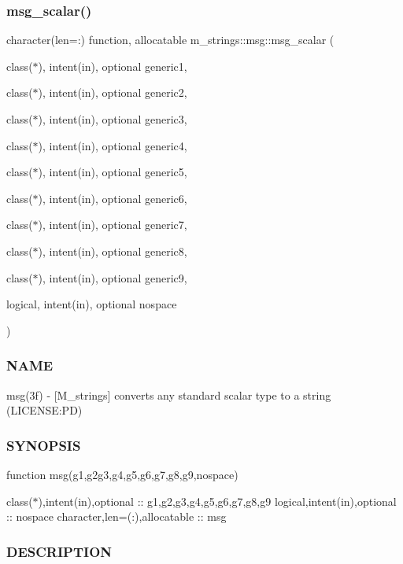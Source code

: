 \subsubsection{\texorpdfstring{msg\+\_\+scalar()}{msg\_scalar()}}
{\footnotesize\ttfamily character(len=\+:) function, allocatable m\+\_\+strings\+::msg\+::msg\+\_\+scalar (\begin{DoxyParamCaption}\item[{class($\ast$), intent(in), optional}]{generic1,  }\item[{class($\ast$), intent(in), optional}]{generic2,  }\item[{class($\ast$), intent(in), optional}]{generic3,  }\item[{class($\ast$), intent(in), optional}]{generic4,  }\item[{class($\ast$), intent(in), optional}]{generic5,  }\item[{class($\ast$), intent(in), optional}]{generic6,  }\item[{class($\ast$), intent(in), optional}]{generic7,  }\item[{class($\ast$), intent(in), optional}]{generic8,  }\item[{class($\ast$), intent(in), optional}]{generic9,  }\item[{logical, intent(in), optional}]{nospace }\end{DoxyParamCaption})\hspace{0.3cm}{\ttfamily [private]}}



\subsubsection*{N\+A\+ME}

msg(3f) -\/ \mbox{[}M\+\_\+strings\mbox{]} converts any standard scalar type to a string (L\+I\+C\+E\+N\+SE\+:PD) \subsubsection*{S\+Y\+N\+O\+P\+S\+IS}

function msg(g1,g2g3,g4,g5,g6,g7,g8,g9,nospace)

class($\ast$),intent(in),optional \+:\+: g1,g2,g3,g4,g5,g6,g7,g8,g9 logical,intent(in),optional \+:\+: nospace character,len=(\+:),allocatable \+:\+: msg

\subsubsection*{D\+E\+S\+C\+R\+I\+P\+T\+I\+ON}

